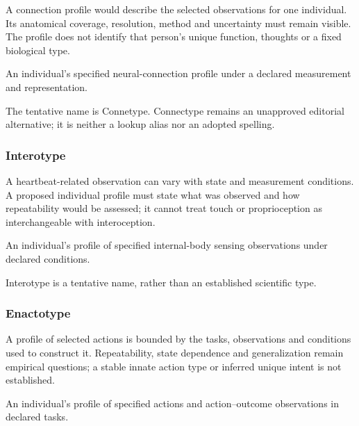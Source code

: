 \noindent A connection profile would describe the selected observations for one individual. Its anatomical coverage, resolution, method and uncertainty must remain visible. The profile does not identify that person’s unique function, thoughts or a fixed biological type.\par

\noindent An individual’s specified neural-connection profile under a declared measurement and representation.\par


\noindent The tentative name is Connetype. Connectype remains an unapproved editorial alternative; it is neither a lookup alias nor an adopted spelling.\par


\subsubsection*{Interotype}

\noindent A heartbeat-related observation can vary with state and measurement conditions. A proposed individual profile must state what was observed and how repeatability would be assessed; it cannot treat touch or proprioception as interchangeable with interoception.\par

\noindent An individual’s profile of specified internal-body sensing observations under declared conditions.\par


\noindent Interotype is a tentative name, rather than an established scientific type.\par


\subsubsection*{Enactotype}

\noindent A profile of selected actions is bounded by the tasks, observations and conditions used to construct it. Repeatability, state dependence and generalization remain empirical questions; a stable innate action type or inferred unique intent is not established.\par

\noindent An individual’s profile of specified actions and action–outcome observations in declared tasks.\par


